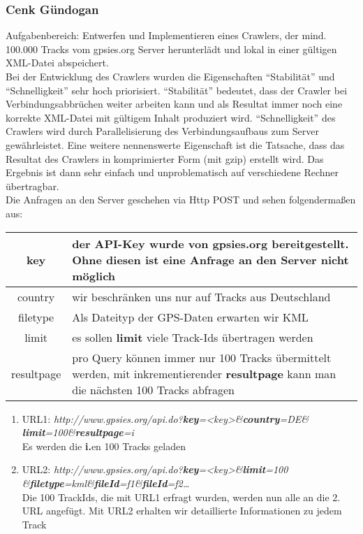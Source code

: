 \subsubsection{Cenk Gündogan}
Aufgabenbereich: Entwerfen und Implementieren eines Crawlers, 
der mind. 100.000 Tracks vom gpsies.org Server herunterlädt und lokal in einer gültigen 
XML-Datei abspeichert.\\

Bei der Entwicklung des Crawlers wurden die Eigenschaften "`Stabilität"' und "`Schnelligkeit"' sehr
hoch priorisiert. "`Stabilität"' bedeutet, dass der Crawler bei Verbindungsabbrüchen weiter arbeiten
kann und als Resultat immer noch eine korrekte XML-Datei mit gültigem Inhalt produziert wird.
"`Schnelligkeit"' des Crawlers wird durch Parallelisierung des Verbindungsaufbaus zum Server gewährleistet.
Eine weitere nennenswerte Eigenschaft ist die Tatsache, dass das Resultat des Crawlers in komprimierter
Form (mit gzip) erstellt wird. Das Ergebnis ist dann sehr einfach und unproblematisch auf verschiedene
Rechner übertragbar.\\

Die Anfragen an den Server geschehen via Http POST und sehen folgendermaßen aus:

\begin{tabular}{|c|p{10cm}|}
  \hline
    key		&	der API-Key wurde von gpsies.org bereitgestellt. Ohne diesen ist eine Anfrage
			an den Server nicht möglich\\\hline
    country	&	wir beschränken uns nur auf Tracks aus Deutschland\\\hline
    filetype	&	Als Dateityp der GPS-Daten erwarten wir KML\\\hline
    limit	&	es sollen \textbf{limit} viele Track-Ids übertragen werden\\\hline
    resultpage	&	pro Query können immer nur 100 Tracks übermittelt werden, mit
			inkrementierender \textbf{resultpage} kann man die nächsten 
			100 Tracks abfragen\\\hline
\end{tabular}

\begin{enumerate}
  \item URL1: \textit{http://www.gpsies.org/api.do?\textbf{key}=<key>\&\textbf{country}=DE\&
	\textbf{limit}=100\&\textbf{resultpage}=i}\\
	Es werden die \textbf{i.}en 100 Tracks geladen
  \item URL2: \textit{http://www.gpsies.org/api.do?\textbf{key}=<key>\&\textbf{limit}=100
    \&\textbf{filetype}=kml\&\textbf{fileId}=f1\&\textbf{fileId}=f2\ldots}\\
	Die 100 TrackIds, die mit URL1 erfragt wurden, werden nun alle an die 2. URL angefügt.
	Mit URL2 erhalten wir detaillierte Informationen zu jedem Track
\end{enumerate}

